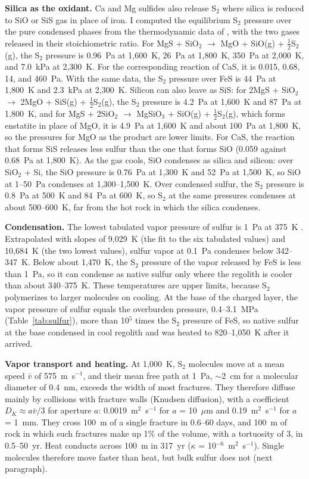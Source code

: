 \documentclass{planetary}
\begin{document}
\textbf{Silica as the oxidant.} Ca and Mg sulfides also release S$_2$ where silica is reduced to SiO or SiS gas in place of iron. I computed the equilibrium S$_2$ pressure over the pure condensed phases from the thermodynamic data of \textcite{mcbride2002}, with the two gases released in their stoichiometric ratio. For MgS + SiO$_2$ $\rightarrow$ MgO + SiO(g) + $\tfrac{1}{2}$S$_2$(g), the S$_2$ pressure is 0.96~Pa at 1,600~K, 26~Pa at 1,800~K, 350~Pa at 2,000~K, and 7.0~kPa at 2,300~K. For the corresponding reaction of CaS, it is 0.015, 0.68, 14, and 460~Pa. With the same data, the S$_2$ pressure over FeS is 44~Pa at 1,800~K and 2.3~kPa at 2,300~K. Silicon can also leave as SiS: for 2MgS + SiO$_2$ $\rightarrow$ 2MgO + SiS(g) + $\tfrac{1}{2}$S$_2$(g), the S$_2$ pressure is 4.2~Pa at 1,600~K and 87~Pa at 1,800~K, and for MgS + 2SiO$_2$ $\rightarrow$ MgSiO$_3$ + SiO(g) + $\tfrac{1}{2}$S$_2$(g), which forms enstatite in place of MgO, it is 4.9~Pa at 1,600~K and about 100~Pa at 1,800~K, so the pressures for MgO as the product are lower limits. For CaS, the reaction that forms SiS releases less sulfur than the one that forms SiO (0.059 against 0.68~Pa at 1,800~K). As the gas cools, SiO condenses as silica and silicon: over SiO$_2$ + Si, the SiO pressure is 0.76~Pa at 1,300~K and 52~Pa at 1,500~K, so SiO at 1--50~Pa condenses at 1,300--1,500~K. Over condensed sulfur, the S$_2$ pressure is 0.8~Pa at 500~K and 84~Pa at 600~K, so S$_2$ at the same pressures condenses at about 500--600~K, far from the hot rock in which the silica condenses.

\textbf{Condensation.} The lowest tabulated vapor pressure of sulfur is 1~Pa at 375~K \parencite{lide2007}. Extrapolated with slopes of 9,029~K (the fit to the six tabulated values) and 10,684~K (the two lowest values), sulfur vapor at 0.1~Pa condenses below 342--347~K. Below about 1,470~K, the S$_2$ pressure of the vapor released by FeS is less than 1~Pa, so it can condense as native sulfur only where the regolith is cooler than about 340--375~K. These temperatures are upper limits, because S$_2$ polymerizes to larger molecules on cooling. At the base of the charged layer, the vapor pressure of sulfur equals the overburden pressure, 0.4--3.1~MPa (Table~\ref{tab:sulfur}), more than 10$^5$ times the S$_2$ pressure of FeS, so native sulfur at the base condensed in cool regolith and was heated to 820--1,050~K after it arrived.

\textbf{Vapor transport and heating.} At 1,000~K, S$_2$ molecules move at a mean speed $\bar{v}$ of 575~m~s$^{-1}$, and their mean free path at 1~Pa, $\sim$2~cm for a molecular diameter of 0.4~nm, exceeds the width of most fractures. They therefore diffuse mainly by collisions with fracture walls (Knudsen diffusion), with a coefficient $D_K \approx a\bar{v}/3$ for aperture $a$: 0.0019~m$^2$~s$^{-1}$ for $a$ = 10~$\mu$m and 0.19~m$^2$~s$^{-1}$ for $a$ = 1~mm. They cross 100~m of a single fracture in 0.6--60 days, and 100~m of rock in which such fractures make up 1\% of the volume, with a tortuosity of 3, in 0.5--50~yr. Heat conducts across 100~m in 317~yr ($\kappa$ = 10$^{-6}$~m$^2$~s$^{-1}$). Single molecules therefore move faster than heat, but bulk sulfur does not (next paragraph).
\end{document}
